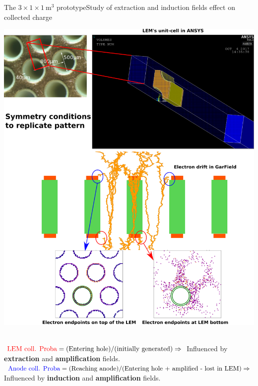 \documentclass[10pt]{beamer}
\begin{document}
\begin{frame}{The \texorpdfstring{$3 \times 1 \times \SI{1}{\meter\cubed}$}{311} prototype}{Study of extraction and induction fields effect on collected charge}
\begin{scriptsize}
\begin{minipage}{0.38\textwidth}
    			\includegraphics[width=\textwidth]{figures/311/coll_proba.png}\\
    		\end{minipage}\\
    		\vspace{0.2cm}
    		$\textcolor{red}{\text{LEM coll. Proba}}=\text{(Entering hole)}/\text{(initially generated)} \Rightarrow$ Influenced by \textbf{extraction} and \textbf{amplification} fields. \\
    		$\textcolor{blue}{\text{Anode coll. Proba}}=\text{(Reaching anode)}/\text{(Entering hole + amplified - lost in LEM)}\Rightarrow$ Influenced by \textbf{induction} and \textbf{amplification} fields.
    	\end{scriptsize} 
    \end{frame}
    
\end{document}
